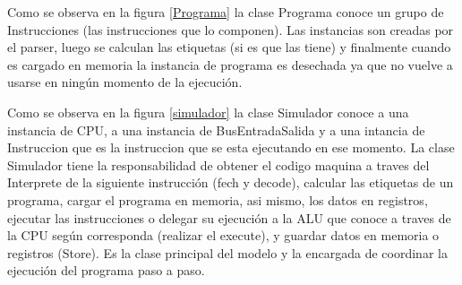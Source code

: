 Como se observa en la figura \ref{Programa} la clase Programa conoce un grupo de Instrucciones (las instrucciones que lo componen). Las instancias son creadas por el parser, luego se calculan las etiquetas (si es que las tiene) y finalmente cuando es cargado en memoria la instancia de programa es desechada ya que no vuelve a usarse en ningún momento de la ejecución.


Como se observa en la figura \ref{simulador} la clase Simulador conoce a una instancia de CPU, a una instancia de BusEntradaSalida y a una intancia de Instruccion que es la instruccion que se esta ejecutando en ese momento.
La clase Simulador tiene la responsabilidad de obtener el codigo maquina a traves del Interprete de la siguiente instrucción (fech y decode), calcular las etiquetas de un programa, cargar el programa en memoria, asi mismo, los datos en registros,  ejecutar las instrucciones o delegar su ejecución a la ALU que conoce a traves de la CPU según corresponda (realizar el execute), y guardar datos en memoria o registros (Store).
Es la clase principal del modelo y la encargada de coordinar la ejecución del programa paso a paso. 







